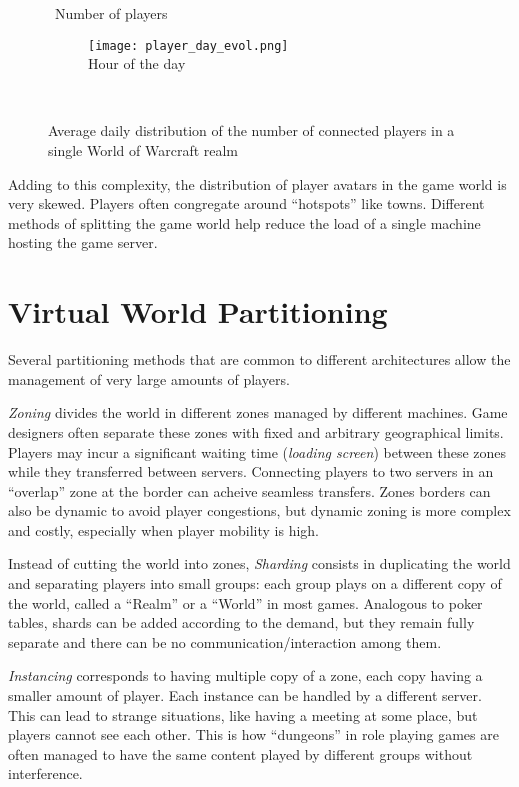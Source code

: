 \documentclass[conference]{IEEEtran}
\begin{document}
\begin{figure}
	\centering
	\begin{sideways}\qquad\quad~Number of players\end{sideways}
	\begin{subfigure}[b]{7.5cm}
		\centering
		\texttt{[image: player\_day\_evol.png]}\\
		Hour of the day
	\end{subfigure}
	\\[0.2cm]
	\caption{Average daily distribution of the number of connected players in a single World of Warcraft realm}
	\label{fig:player_day_evol}
\end{figure}


Adding to this complexity, the distribution of player avatars in the game world is very skewed. Players often congregate around ``hotspots'' like towns. Different methods of splitting the game world help reduce the load of a single machine hosting the game server.

\section{Virtual World Partitioning}

Several partitioning methods that are common to different architectures allow the management of very large amounts of players.

\textit{Zoning} divides the world in different zones managed by different machines. Game designers often separate these zones with fixed and arbitrary geographical limits. Players may incur a significant waiting time (\textit{loading screen}) between these zones while they transferred between servers. Connecting players to two servers in an ``overlap'' zone at the border can acheive seamless transfers. Zones borders can also be dynamic to avoid player congestions, but dynamic zoning is more complex and costly, especially when player mobility is high.

Instead of cutting the world into zones, \textit{Sharding} consists in duplicating the world and separating players into small groups: each group plays on a different copy of the world, called a ``Realm'' or a ``World'' in most games. Analogous to poker tables, shards can be added according to the demand, but they remain fully separate and there can be no communication/interaction among them.

\textit{Instancing} corresponds to having multiple copy of a zone, each copy having a smaller amount of player. Each instance can be handled by a different server. This can lead to strange situations, like having a meeting at some place, but players cannot see each other. This is how ``dungeons'' in role playing games are often managed to have the same content played by different groups without interference.
\end{document}
